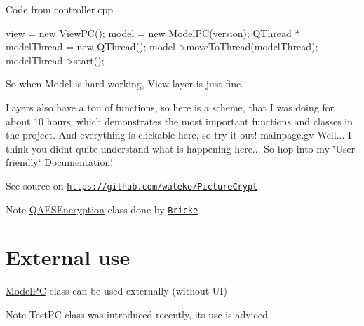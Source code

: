 Code from controller.\+cpp 
\begin{DoxyCode}
view = \textcolor{keyword}{new} \hyperlink{class_view_p_c}{ViewPC}();
model = \textcolor{keyword}{new} \hyperlink{class_model_p_c}{ModelPC}(version);
QThread * modelThread = \textcolor{keyword}{new} QThread();
model->moveToThread(modelThread);
modelThread->start();
\end{DoxyCode}
 So when Model is hard-\/working, View layer is just fine.

Layers also have a ton of functions, so here is a scheme, that I was doing for about 10 hours, which demonstrates the most important functions and classes in the project. And everything is clickable here, so try it out!  mainpage.\+gv Well... I think you didn\textquotesingle{}t quite understand what is happening here... So hop into my \char`\"{}\+User-\/friendly\char`\"{} Documentation!

See source on \href{https://github.com/waleko/PictureCrypt}{\tt https\+://github.\+com/waleko/\+Picture\+Crypt}

\begin{DoxyNote}{Note}
\hyperlink{class_q_a_e_s_encryption}{Q\+A\+E\+S\+Encryption} class done by \href{https://github.com/bricke}{\tt Bricke}
\end{DoxyNote}
\hypertarget{index_ext-use}{}\section{External use}\label{index_ext-use}
\hyperlink{class_model_p_c}{Model\+PC} class can be used externally (without UI) \begin{DoxyNote}{Note}
Test\+PC class was introduced recently, its use is adviced.
\end{DoxyNote}

